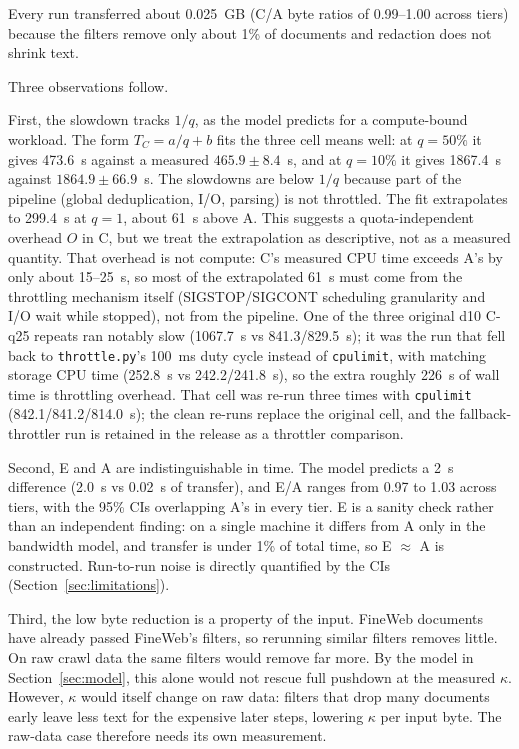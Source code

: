 \documentclass[11pt]{article}
\begin{document}
Every run transferred about 0.025~GB (C/A byte ratios of 0.99--1.00 across tiers) because the filters remove only about 1\% of documents and redaction does not shrink text.

Three observations follow.

First, the slowdown tracks $1/q$, as the model predicts for a compute-bound workload. The form $T_C = a/q + b$ fits the three cell means well: at $q = 50\%$ it gives 473.6~s against a measured $465.9 \pm 8.4$~s, and at $q = 10\%$ it gives 1867.4~s against $1864.9 \pm 66.9$~s. The slowdowns are below $1/q$ because part of the pipeline (global deduplication, I/O, parsing) is not throttled. The fit extrapolates to 299.4~s at $q = 1$, about 61~s above A. This suggests a quota-independent overhead $O$ in C, but we treat the extrapolation as descriptive, not as a measured quantity. That overhead is not compute: C's measured CPU time exceeds A's by only about 15--25~s, so most of the extrapolated 61~s must come from the throttling mechanism itself (SIGSTOP/SIGCONT scheduling granularity and I/O wait while stopped), not from the pipeline. One of the three original d10 C-q25 repeats ran notably slow (1067.7~s vs 841.3/829.5~s); it was the run that fell back to \texttt{throttle.py}'s 100~ms duty cycle instead of \texttt{cpulimit}, with matching storage CPU time (252.8~s vs 242.2/241.8~s), so the extra roughly 226~s of wall time is throttling overhead. That cell was re-run three times with \texttt{cpulimit} (842.1/841.2/814.0~s); the clean re-runs replace the original cell, and the fallback-throttler run is retained in the release as a throttler comparison.

Second, E and A are indistinguishable in time. The model predicts a 2~s difference (2.0~s vs 0.02~s of transfer), and E/A ranges from 0.97 to 1.03 across tiers, with the 95\% CIs overlapping A's in every tier. E is a sanity check rather than an independent finding: on a single machine it differs from A only in the bandwidth model, and transfer is under 1\% of total time, so E $\approx$ A is constructed. Run-to-run noise is directly quantified by the CIs (Section~\ref{sec:limitations}).

Third, the low byte reduction is a property of the input. FineWeb documents have already passed FineWeb's filters, so rerunning similar filters removes little. On raw crawl data the same filters would remove far more. By the model in Section~\ref{sec:model}, this alone would not rescue full pushdown at the measured $\kappa$. However, $\kappa$ would itself change on raw data: filters that drop many documents early leave less text for the expensive later steps, lowering $\kappa$ per input byte. The raw-data case therefore needs its own measurement.
\end{document}
